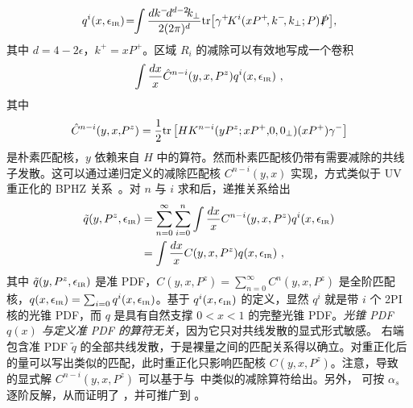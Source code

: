 \begin{align}
	q^{i}(x,\epsilon_{\mbox{\tiny IR}})\!=\!\!\int \frac{dk^-\!d^{d-2}\!k_\perp}{2(2\pi)^{d}}{\rm tr} \big[\gamma^+\! K^i(xP^+\!,k^-\!,k_\perp;P)\slashed{P}\big],
\end{align}
其中 $d=4-2\epsilon$，$k^+=xP^+$。区域 $R_i$ 的减除可以有效地写成一个卷积
\begin{align}
	\int \frac{dx}{x} \hat C^{n-i}(y,x,P^z)q^i(x,\epsilon_{\mbox{\tiny IR}}) \ ,
\end{align}
其中
\begin{align}
	\hat C^{n-i}(y,x,\!P^z)=\frac{1}{2}{\rm tr}\left[HK^{n-i}(yP^z;xP^+,\!0,0_\perp)(xP^+)\gamma^-\right]
\end{align}
是朴素匹配核，$y$ 依赖来自 $H$ 中的算符。然而朴素匹配核仍带有需要减除的共线子发散。这可以通过递归定义的减除匹配核 $C^{n-i}(y,x)$ 实现，方式类似于 UV 重正化的 BPHZ 关系~\cite{Collins:2011zzd}。对 $n$ 与 $i$ 求和后，递推关系给出
\begin{align}\label{eq:subtraction}
	\tilde q(y,P^z,\epsilon_{\mbox{\tiny IR}})&=\sum_{n=0}^{\infty}\sum_{i=0}^n \int \frac{dx}{x} C^{n-i}(y,x,P^z)q^i(x,\epsilon_{\mbox{\tiny IR}})\nn\\
	&=\int \frac{dx}{x} C(y,x,P^z)q(x,\epsilon_{\mbox{\tiny IR}}) \ ,
\end{align}
其中 $\tilde q(y,P^z,\epsilon_{\mbox{\tiny IR}})$ 是准 PDF，$C(y,x,P^z)=\sum_{n=0}^{\infty} C^{n}(y,x,P^z)$ 是全阶匹配核，$q(x,\epsilon_{\mbox{\tiny IR}})=\sum_{i=0} q^i(x,\epsilon_{\mbox{\tiny IR}})$。基于 $q^i(x,\epsilon_{\mbox{\tiny IR}})$ 的定义，显然 $q^i$ 就是带 $i$ 个 2PI 核的光锥 PDF，而 $q$ 是具有自然支撑 $0<x<1$ 的完整光锥 PDF。{\it 光锥 PDF $q(x)$ 与定义准 PDF 的算符无关}，因为它只对共线发散的显式形式敏感。 右端包含准 PDF $\tilde q$ 的全部共线发散，于是裸量之间的匹配关系得以确立。对重正化后的量可以写出类似的匹配，此时重正化只影响匹配核 $C(y,x,P^z)$。注意，导致  的显式解 $C^{n-i}(y,x,P^z)$ 可以基于与~\cite{Collins:2011zzd}中类似的减除算符给出。另外， 可按 $\alpha_s$ 逐阶反解，从而证明了 ，并可推广到 。

